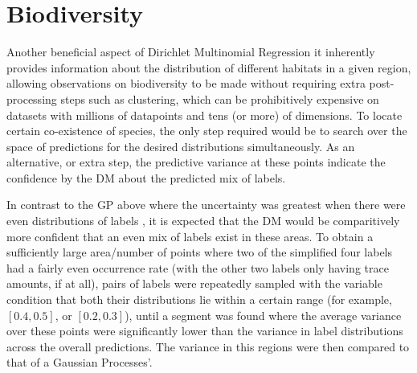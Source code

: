 \section{Biodiversity}

Another beneficial aspect of Dirichlet Multinomial Regression it inherently provides information about the distribution of different habitats in a given region, allowing observations on biodiversity to be made without requiring extra post-processing steps such as clustering, which can be prohibitively expensive on datasets with millions of datapoints and tens (or more) of dimensions. To locate certain co-existence of species, the only step required would be to search over the space of predictions for the desired distributions simultaneously. As an alternative, or extra step, the predictive variance at these points indicate the confidence by the DM about the predicted mix of labels. 




In contrast to the GP above where the uncertainty was greatest when there were even distributions of labels , it is expected that the DM would be comparitively more confident that an even mix of labels exist in these areas. To obtain a sufficiently large area/number of points where two of the simplified four labels had a fairly even occurrence rate (with the other two labels only having trace amounts, if at all), pairs of labels were repeatedly sampled with the variable condition that both their distributions lie within a certain range (for example, $[0.4, 0.5]$, or $[0.2, 0.3]$), until a segment was found where the average variance over these points were significantly lower than the variance in label distributions across the overall predictions. The variance in this regions were then compared to that of a Gaussian Processes'.


